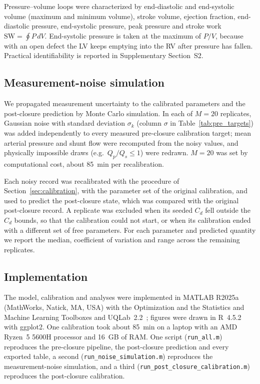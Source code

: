 Pressure--volume loops were characterized by end-diastolic and end-systolic volume (maximum and minimum volume), stroke volume, ejection fraction, end-diastolic pressure, end-systolic pressure, peak pressure and stroke work $\mathrm{SW} = \oint P\,dV$. End-systolic pressure is taken at the maximum of $P/V$, because with an open defect the LV keeps emptying into the RV after pressure has fallen. Practical identifiability is reported in Supplementary Section~S2.

\FloatBarrier
\subsection{Measurement-noise simulation}
\label{sec:noise_methods}
We propagated measurement uncertainty to the calibrated parameters and the post-closure prediction by Monte Carlo simulation. In each of $M = 20$ replicates, Gaussian noise with standard deviation $\sigma_k$ (column $\sigma$ in Table~\ref{tab:pre_targets}) was added independently to every measured pre-closure calibration target; mean arterial pressure and shunt flow were recomputed from the noisy values, and physically impossible draws (e.g.\ $Q_p/Q_s \le 1$) were redrawn. $M = 20$ was set by computational cost, about 85~min per recalibration.

Each noisy record was recalibrated with the procedure of Section~\ref{sec:calibration}, with the parameter set of the original calibration, and used to predict the post-closure state, which was compared with the original post-closure record. A replicate was excluded when its seeded $C_d$ fell outside the $C_d$ bounds, so that the calibration could not start, or when its calibration ended with a different set of free parameters. For each parameter and predicted quantity we report the median, coefficient of variation and range across the remaining replicates.

\FloatBarrier
\subsection{Implementation}
The model, calibration and analyses were implemented in MATLAB R2025a (MathWorks, Natick, MA, USA) with the Optimization and the Statistics and Machine Learning Toolboxes and UQLab~2.2~\cite{Marelli2014}; figures were drawn in R~4.5.2 with ggplot2. One calibration took about 85~min on a laptop with an AMD Ryzen~5 5600H processor and 16~GB of RAM. One script (\texttt{run\_all.m}) reproduces the pre-closure pipeline, the post-closure prediction and every exported table, a second (\texttt{run\_noise\_simulation.m}) reproduces the measurement-noise simulation, and a third (\texttt{run\_post\_closure\_calibration.m}) reproduces the post-closure calibration.
